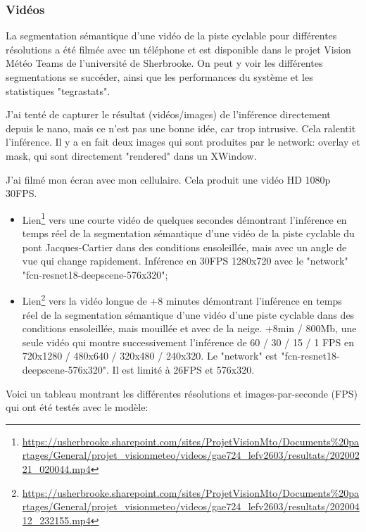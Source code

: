 \subsubsection{Vidéos}
\par La segmentation sémantique d'une vidéo de la piste cyclable pour différentes résolutions a été filmée avec un téléphone et est disponible dans le projet Vision Météo Teams de l'université de Sherbrooke. On peut y voir les différentes segmentations se succéder, ainsi que les performances du système et les statistiques "tegrastats". 
\par J'ai tenté de capturer le résultat (vidéos/images) de l'inférence directement depuis le nano, mais ce n'est pas une bonne idée, car trop intrusive. Cela ralentit l'inférence. Il y a en fait deux images qui sont produites par le network: overlay et mask, qui sont directement "rendered" dans un XWindow. 
\par J'ai filmé mon écran avec mon cellulaire. Cela produit une vidéo HD 1080p 30FPS. 
\begin{itemize}
   \item Lien\footnote{\url{https://usherbrooke.sharepoint.com/sites/ProjetVisionMto/Documents\%20partages/General/projet_visionmeteo/videos/gae724_lefv2603/resultats/20200221_020044.mp4}} vers une courte vidéo de quelques secondes démontrant l'inférence en temps réel de la segmentation sémantique d'une vidéo de la piste cyclable du pont Jacques-Cartier dans des conditions ensoleillée, mais avec un angle de vue qui change rapidement. Inférence en 30FPS 1280x720 avec le "network" "fcn-resnet18-deepscene-576x320";
   \item Lien\footnote{\url{https://usherbrooke.sharepoint.com/sites/ProjetVisionMto/Documents\%20partages/General/projet_visionmeteo/videos/gae724_lefv2603/resultats/20200412_232155.mp4}} vers la vidéo longue de +8 minutes démontrant l'inférence en temps réel de la segmentation sémantique d'une vidéo d'une piste cyclable dans des conditions ensoleillée, mais mouillée et avec de la neige. +8min / 800Mb, une seule vidéo qui montre successivement l'inférence de 60 / 30 / 15 / 1 FPS en 720x1280 / 480x640 / 320x480 / 240x320. Le "network" est "fcn-resnet18-deepscene-576x320". Il est limité à 26FPS et 576x320.
\end{itemize}
\par Voici un tableau montrant les différentes résolutions et images-par-seconde (FPS) qui ont été testés avec le modèle:
